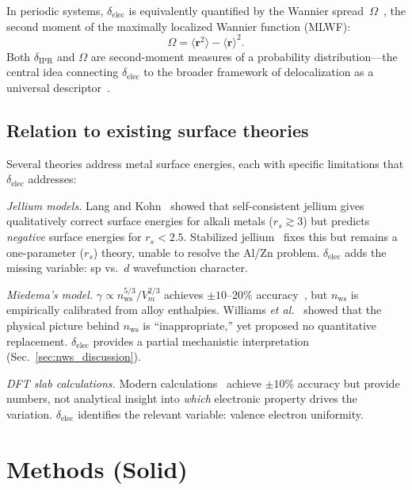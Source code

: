 \documentclass[twocolumn,showpacs,preprintnumbers,amsmath,amssymb,prb]{revtex4-2}
\begin{document}
In periodic systems, $\delta_\mathrm{elec}$ is equivalently
quantified by the Wannier spread~$\Omega$~\cite{Pizzi2020},
the second moment of the maximally localized Wannier function
(MLWF):
\begin{equation}
  \Omega = \langle \mathbf{r}^2 \rangle - \langle \mathbf{r} \rangle^2.
  \label{eq:wannier_spread}
\end{equation}
Both $\delta_\mathrm{IPR}$ and $\Omega$ are second-moment
measures of a probability distribution---the central idea
connecting $\delta_\mathrm{elec}$ to the broader framework
of delocalization as a universal descriptor~\cite{SentoOpticsPaper1}.

\subsection{Relation to existing surface theories}

Several theories address metal surface energies, each with
specific limitations that $\delta_\mathrm{elec}$ addresses:

\emph{Jellium models.}
Lang and Kohn~\cite{LangKohn1970,LangKohn1971} showed that
self-consistent jellium gives qualitatively correct surface
energies for alkali metals ($r_s \gtrsim 3$) but predicts
\emph{negative} surface energies for $r_s < 2.5$.
Stabilized jellium~\cite{Perdew1990} fixes this but remains
a one-parameter ($r_s$) theory, unable to resolve the Al/Zn
problem.
$\delta_\mathrm{elec}$ adds the missing variable:
sp vs.\ $d$ wavefunction character.

\emph{Miedema's model.}
$\gamma \propto n_\mathrm{ws}^{5/3} / V_m^{2/3}$
achieves $\pm 10$--$20\%$ accuracy~\cite{deBoer1988}, but
$n_\mathrm{ws}$ is empirically calibrated from alloy enthalpies.
Williams \textit{et al.}~\cite{WilliamsGelattMoruzzi1980}
showed that the physical picture behind $n_\mathrm{ws}$
is ``inappropriate,'' yet proposed no quantitative replacement.
$\delta_\mathrm{elec}$ provides a partial mechanistic
interpretation (Sec.~\ref{sec:nws_discussion}).

\emph{DFT slab calculations.}
Modern calculations~\cite{Vitos1998,SinghMiller2009,Tran2016}
achieve $\pm 10\%$ accuracy but provide numbers, not analytical
insight into \emph{which} electronic property drives the variation.
$\delta_\mathrm{elec}$ identifies the relevant variable:
valence electron uniformity.


\section{Methods (Solid)}
\label{sec:methods_solid}
\end{document}
